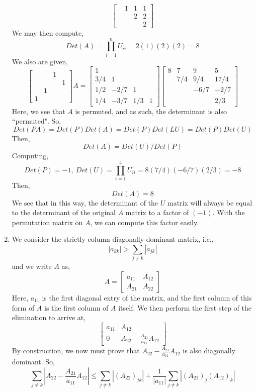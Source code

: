 \documentclass[letterpaper,10pt]{article}
\begin{document}
\begin{enumerate}
\[\begin{bmatrix}
& 1 & 1 & 1\\
&&2 & 2\\
&&& 2
\end{bmatrix} \]
We may then compute,
\[Det(A)=\prod_{i=1}^nU_{ii}=2(1)(2)(2)=8\]
We also are given,
\[\begin{bmatrix}
&&1\\&&&1\\&1\\1
\end{bmatrix}A=\begin{bmatrix}
1\\3/4 & 1\\1/2 & -2/7 & 1\\1/4 & -3/7 & 1/3 & 1
\end{bmatrix}\begin{bmatrix}
8 & 7 & 9 & 5\\
& 7/4 & 9/4 & 17/4\\
&&-6/7 & -2/7\\
&&&2/3
\end{bmatrix} \]
Here, we see that $A$ is permuted, and as such, the determinant is also ``permuted". So, \[Det(PA)=Det(P)Det(A)=Det(P)Det(LU)=Det(P)Det(U)\]
Then,
\[Det(A)=Det(U)/Det(P)\]
Computing,
\[Det(P)=-1,\ Det(U)=\prod_{i=1}^4U_{ii}=8(7/4)(-6/7)(2/3)=-8\]
Then,
\[Det(A)=8\]
We see that in this way, the determinant of the $U$ matrix will always be equal to the determinant of the original $A$ matrix to a factor of $(-1)$. With the permutation matrix on $A$, we can compute this factor easily.
\item We consider the strictly column diagonally dominant matrix, i.e.,
\[|a_{kk}| > \sum_{j\neq k}|a_{jk}|\]
and we write $A$ as,
\[A=\begin{bmatrix}
a_{11} & A_{12}\\A_{21} & A_{22}
\end{bmatrix}\]
Here, $a_{11}$ is the first diagonal entry of the matrix, and the first column of this form of $A$ is the first column of $A$ itself. We then perform the first step of the elimination to arrive at,
\[\begin{bmatrix}
a_{11} & A_{12}\\0 & A_{22}-\frac{A_{21}}{a_{11}}A_{12}
\end{bmatrix} \]
By construction, we now must prove that $A_{22}-\frac{A_{21}}{a_{11}}A_{12}$ is also diagonally dominant. So,
\[\sum_{j\neq k}\left|A_{22}-\frac{A_{21}}{a_{11}}A_{12}\right|\leq \sum_{j\neq k}|(A_{22})_{jk}|+\frac{1}{|a_{11}|}\sum_{j\neq k}\left|(A_{21})_{j}(A_{12})_{k}\right|\]

\end{enumerate}
\end{document}
